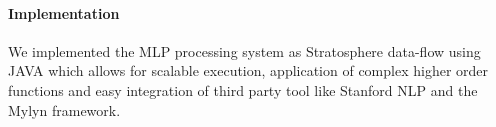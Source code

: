 \documentclass[runningheads]{llncs}
\begin{document}
\paragraph{Implementation}
We implemented the MLP processing system \cite{github} as Stratosphere data-flow using JAVA which allows for scalable execution, application of complex higher order functions and easy integration of third party tool like Stanford NLP and the Mylyn framework.
%
%
%
%
%
%
\end{document}
